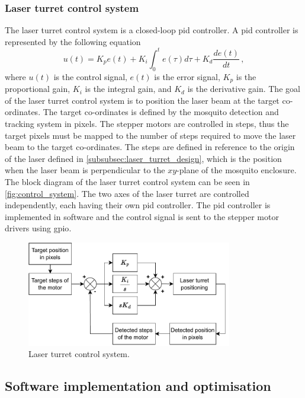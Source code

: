 \subsubsection{Laser turret control system}
The laser turret control system is a closed-loop \gls{pid} controller. A \gls{pid} controller is represented by the following equation
\begin{equation}
  \label{eq:pid_controller}
  u(t) = K_p e(t) + K_i \int_{0}^{t} e(\tau) d\tau + K_d \frac{de(t)}{dt}\,,
\end{equation}
where $u(t)$ is the control signal, $e(t)$ is the error signal, $K_p$ is the proportional gain, $K_i$ is the integral gain, and $K_d$ is the derivative gain. The goal of the laser turret control system is to position the laser beam at the target co-ordinates. The target co-ordinates is defined by the mosquito detection and tracking system in pixels. The stepper motors are controlled in steps, thus the target pixels must be mapped to the number of steps required to move the laser beam to the target co-ordinates. The steps are defined in reference to the origin of the laser defined in \autoref{subsubsec:laser_turret_design}, which is the position when the laser beam is perpendicular to the $xy$-plane of the mosquito enclosure. The block diagram of the laser turret control system can be seen in \autoref{fig:control_system}. The two axes of the laser turret are controlled independently, each having their own \gls{pid} controller. The \gls{pid} controller is implemented in software and the control signal is sent to the stepper motor drivers using \gls{gpio}.
\begin{figure}[!htb]
  \centering
  \includegraphics[width=0.8\textwidth]{figures/control_system.pdf}
  \caption{Laser turret control system.}
  \label{fig:control_system}
\end{figure}


\FloatBarrier
\subsection{Software implementation and optimisation}\label{subsec:software_implementation}
